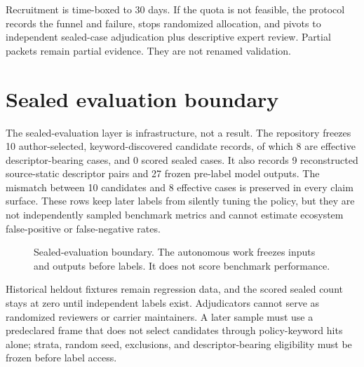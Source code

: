 \documentclass[11pt,letterpaper]{article}
\begin{document}
Recruitment is time-boxed to 30 days. If the quota is not feasible, the protocol records the funnel and failure, stops randomized allocation, and pivots to independent sealed-case adjudication plus descriptive expert review. Partial packets remain partial evidence. They are not renamed validation.

\section{Sealed evaluation boundary}

The sealed-evaluation layer is infrastructure, not a result. The repository freezes 10 author-selected, keyword-discovered candidate records, of which 8 are effective descriptor-bearing cases, and 0 scored sealed cases. It also records 9 reconstructed source-static descriptor pairs and 27 frozen pre-label model outputs. The mismatch between 10 candidates and 8 effective cases is preserved in every claim surface. These rows keep later labels from silently tuning the policy, but they are not independently sampled benchmark metrics and cannot estimate ecosystem false-positive or false-negative rates.

\begin{figure}[H]
\centering
{}
\caption{Sealed-evaluation boundary. The autonomous work freezes inputs and outputs before labels. It does not score benchmark performance.}
\end{figure}

Historical heldout fixtures remain regression data, and the scored sealed count stays at zero until independent labels exist. Adjudicators cannot serve as randomized reviewers or carrier maintainers. A later sample must use a predeclared frame that does not select candidates through policy-keyword hits alone; strata, random seed, exclusions, and descriptor-bearing eligibility must be frozen before label access.
\end{document}

